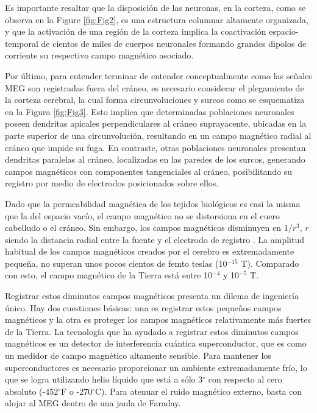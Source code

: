 \documentclass[11pt,letterpaper]{article}
\numberwithin{equation}{subsection}
\numberwithin{table}{subsection}
\begin{document}
\bigskip
\noindent Es importante resaltar que la disposición de las neuronas, en la corteza, como se observa en la Figure \ref{fig:Fig2}, es una estructura columnar altamente organizada, y que la activación de una región de la corteza implica la coactivación espacio-temporal de cientos de miles de cuerpos neuronales formando grandes dipolos de corriente su respectivo campo magnético asociado.


\bigskip
\noindent  Por último, para entender terminar de entender conceptualmente como las señales MEG son registradas fuera del cráneo, es necesario considerar el plegamiento de la corteza cerebral, la cual forma circunvoluciones y surcos como se esquematiza en la Figura \ref{fig:Fig3}. Esto implica que determinadas poblaciones neuronales poseen dendritas apicales perpendiculares al cráneo suprayacente, ubicadas en la parte superior de una circunvolución, resultando en un campo magnético radial al cráneo que impide su fuga. En contraste, otras poblaciones neuronales presentan dendritas paralelas al cráneo, localizadas en las paredes de los surcos, generando campos magnéticos con componentes tangenciales al cráneo, posibilitando su registro por medio de electrodos posicionados sobre ellos.

\bigskip
\noindent Dado que la permeabilidad magnética de los tejidos biológicos es casi la misma que la del espacio vacío, el campo magnético no se distorsiona en el cuero cabelludo o el cráneo. Sin embargo, los campos magnéticos disminuyen en 1/$r^3$, $r$ siendo la distancia radial entre la fuente y el electrodo de registro \cite{singh2014magnetoencephalography}. La amplitud habitual de los campos magnéticos creados por el cerebro es extremadamente pequeña, no superan unos pocos cientos de femto teslas (10$^{-15}$ T). Comparado con esto, el campo magnético de la Tierra está entre 10$^{-4}$ y 10$^{-5}$ T.

\bigskip
\noindent 
Registrar estos diminutos campos magnéticos presenta un dilema de ingeniería único. Hay dos cuestiones básicas: una es registrar estos pequeños campos magnéticos y la otra es proteger los campos magnéticos relativamente más fuertes de la Tierra. La tecnología que ha ayudado a registrar estos diminutos campos magnéticos es un detector de interferencia cuántica superconductor, que es como un medidor de campo magnético altamente sensible. Para mantener los superconductores es necesario proporcionar un ambiente extremadamente frío, lo que se logra utilizando helio líquido que está a sólo 3$^{\circ}$ con respecto al cero absoluto (-452$^{\circ}$F o -270$^{\circ}$C). Para atenuar el ruido magnético externo, basta con alojar al MEG dentro de una jaula de Faraday.
\end{document}
